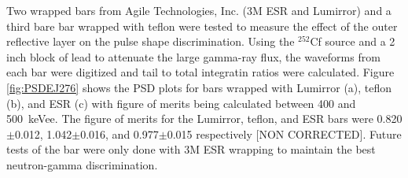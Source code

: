  \begin{comment}
   \begin{figure*}[hbt]
 \centering
  \texttt{[image: Figures/PSDWrappingComparison.eps]}
  \caption{Two dimensional histograms of the CCM PSD of three different types of wrapping. [NON CORRECTED]}
  \label{fig:PSDEJ276}
\end{figure*}
\end{comment}

Two wrapped bars from Agile Technologies, Inc. (3M\textsuperscript{\texttrademark} ESR and Lumirror\textsuperscript{\texttrademark}) and a third bare bar wrapped with teflon were tested to measure the effect of the outer reflective layer on the pulse shape discrimination. Using the $^{252}$Cf source and a 2 inch block of lead to attenuate the large gamma-ray flux, the waveforms from each bar were digitized and tail to total integratin ratios were calculated. Figure \ref{fig:PSDEJ276} shows the PSD plots for bars wrapped with Lumirror\textsuperscript{\texttrademark} (a), teflon (b), and ESR (c) with figure of merits being calculated between 400 and 500~keVee. The figure of merits for the Lumirror\textsuperscript{\texttrademark}, teflon, and ESR bars were 0.820$\pm$0.012, 1.042$\pm$0.016, and 0.977$\pm$0.015 respectively [NON CORRECTED]. Future tests of the bar were only done with 3M\textsuperscript{\texttrademark} ESR wrapping to maintain the best neutron-gamma discrimination.

\begin{comment}
\subsubsection{SiPM}
\begin{figure}[htbp]
  \centering
  \texttt{[image: Figures/SiPM\_PSD.png]}
  \caption{Single SiPM PSD response from ESR wrapped EJ-276 bar. The gamma flux was attenuated with a 2 inch lead shielding. The figure of merit was calculated to be 0.90 for QDC values greater that 200k and 1.2 for QDC values [600k,800k] (REPLOT WITH ENERGIES).}
  \label{fig:SiPMPSD}
\end{figure}
SiPMs have a characteristically long decay length without any pre-amplificication. The effect of such a long decay on neutron-gamma discrimination was measured with the ESR-wrapped EJ-276 bar with a single SiPM detector on each end. The signals were digitized and analyzed with the CCM to determine the effect of light detection against detector type. Figure \ref{fig:SiPMPSD} shows the SiPM capabilities to EJ-276 neutron and gamma-ray scintillation.
\end{comment}

